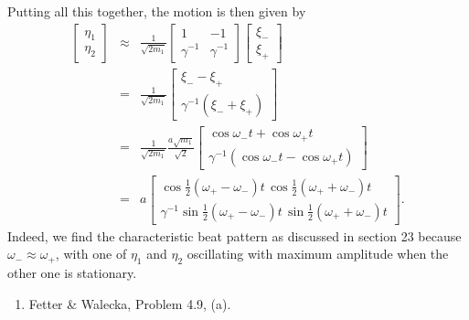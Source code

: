 \documentclass[letterpaper,11pt]{article}
\begin{document}
Putting all this together, the motion is then given by
\begin{eqnarray*}
 \left[ \begin{array}{c}
  \eta_1 \\
  \eta_2
 \end{array} \right] & \approx &
 \frac{1}{\sqrt{2 m_1}}
 \left[ \begin{array}{cc}
  1 & - 1 \\
  \gamma^{-1} & \gamma^{-1}
 \end{array} \right]
 \left[ \begin{array}{c}
  \xi_- \\
  \xi_+
 \end{array} \right] \\
 & = & 
 \frac{1}{\sqrt{2 m_1}}
 \left[ \begin{array}{c}
  \xi_- - \xi_+ \\
  \gamma^{-1} (\xi_- + \xi_+)
 \end{array} \right] \\
 & = & \frac{1}{\sqrt{2 m_1}} \frac{a\sqrt{m_1}}{\sqrt{2}}
 \left[ \begin{array}{c}
  \cos\omega_-t + \cos\omega_+t \\
  \gamma^{-1} (\cos\omega_-t - \cos\omega_+t)
 \end{array} \right] \\
 & = & 
 a
 \left[ \begin{array}{c}
  \cos\frac{1}{2}(\omega_+ - \omega_-)t \, \cos\frac{1}{2}(\omega_+ + \omega_-)t \\
  \gamma^{-1} \sin\frac{1}{2}(\omega_+ - \omega_-)t \, \sin\frac{1}{2}(\omega_+ + \omega_-)t
 \end{array} \right].
\end{eqnarray*}
Indeed, we find the characteristic beat pattern as discussed in section 23 because $\omega_- \approx \omega_+$, with one of $\eta_1$ and $\eta_2$ oscillating with maximum amplitude when the other one is stationary.


\begin{enumerate}[resume]
 \item Fetter \& Walecka, Problem 4.9, (a).
\end{enumerate}
\end{document}
